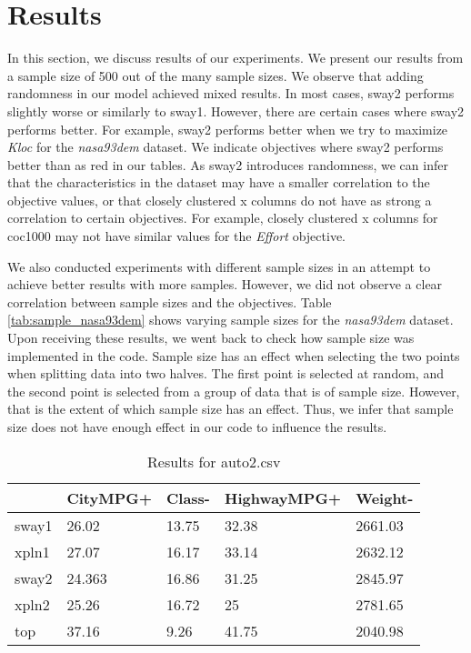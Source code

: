 \section{Results}
\label{sec:results}


In this section, we discuss results of our experiments. We present our
results from a sample size of 500 out of the many sample sizes. We
observe that adding randomness in our model achieved mixed results. In
most cases, sway2 performs slightly worse or similarly to sway1.
However, there are certain cases where sway2 performs better. For
example, sway2 performs better when we try to maximize \textit{Kloc} for
the \textit{nasa93dem} dataset. We indicate objectives where sway2
performs better than as red in our tables. As sway2 introduces
randomness, we can infer that the characteristics in the dataset may
have a smaller correlation to the objective values, or that closely
clustered x columns do not have as strong a correlation to certain
objectives. For example, closely clustered x columns for coc1000 may not
have similar values for the \textit{Effort} objective. 

We also conducted experiments with different sample sizes in an attempt
to achieve better results with more samples. However, we did not observe
a clear correlation between sample sizes and the objectives. Table
\ref{tab:sample_nasa93dem} shows varying sample sizes for the
\textit{nasa93dem} dataset. Upon receiving these results, we went back
to check how sample size was implemented in the code. Sample size has an
effect when selecting the two points when splitting data into two
halves. The first point is selected at random, and the second point is
selected from a group of data that is of sample size. However, that is
the extent of which sample size has an effect. Thus, we infer that
sample size does not have enough effect in our code to influence the
results. 

\begin{table}[]
  \begin{center}
  \begin{tabular}{lllll}
          & CityMPG+      & Class-     & HighwayMPG+ & Weight-   \\
    \hline
    sway1 & 26.02         & 13.75      & 32.38       & 2661.03 \\
    xpln1 & 27.07         & 16.17      & 33.14       & 2632.12   \\
    sway2 & 24.363        & 16.86      & 31.25       & 2845.97   \\
    xpln2 & 25.26         & 16.72      & 25          & 2781.65   \\
    top   & 37.16         & 9.26       & 41.75       & 2040.98    
  \end{tabular}
  \end{center}
  \caption{Results for auto2.csv}
  \label{tab:auto2}
\end{table}


